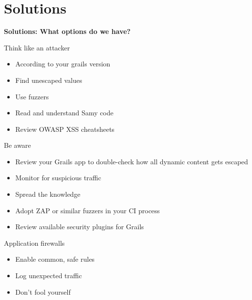 
\section{Solutions}

\begin{frame}[plain]
    \begin{center}
      \Huge\bfseries
      Solutions: What options do we have?
    \end{center}
\end{frame}

\begin{frame}[plain]{Think like an attacker}
  \begin{itemize}[<+-| alert@+>]
    \item According to your grails version
    \item Find unescaped values
    \item Use fuzzers
    \item Read and understand Samy code
    \item Review OWASP XSS cheatsheets
  \end{itemize}
\end{frame}

\begin{frame}[plain]{Be aware}
  \begin{itemize}[<+-| alert@+>]
    \item Review your Grails app to double-check how all dynamic content gets escaped
    \item Monitor for suspicious traffic
    \item Spread the knowledge
    \item Adopt ZAP or similar fuzzers in your CI process
    \item Review available security plugins for Grails
  \end{itemize}
\end{frame}

\begin{frame}[plain]{Application firewalls}
 \begin{itemize}[<+-| alert@+>]
   \item Enable common, safe rules
   \item Log unexpected traffic
   \item Don't fool yourself
 \end{itemize}
\end{frame}

